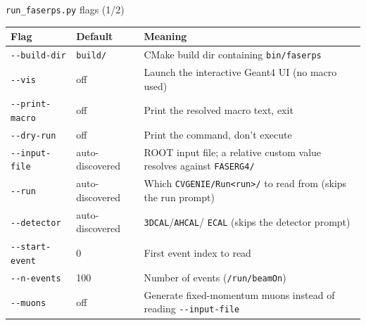 \documentclass[aspectratio=169]{beamer}
\begin{document}
\begin{frame}{\texttt{run\_faserps.py} flags (1/2)}
  \centering
  \tiny
  \begin{tabular}{@{}p{3.1cm}p{2.1cm}p{5.8cm}@{}}
    \toprule
    \textbf{Flag} & \textbf{Default} & \textbf{Meaning} \\
    \midrule
    \texttt{-{}-build-dir} & \texttt{build/} & CMake build dir containing
      \texttt{bin/faserps} \\
    \texttt{-{}-vis} & off & Launch the interactive Geant4 UI (no macro used) \\
    \texttt{-{}-print-macro} & off & Print the resolved macro text, exit \\
    \texttt{-{}-dry-run} & off & Print the command, don't execute \\
    \texttt{-{}-input-file} & auto-discovered & ROOT input file; a relative
      custom value resolves against \texttt{FASERG4/} \\
    \texttt{-{}-run} & auto-discovered & Which \texttt{CVGENIE/Run<run>/} to
      read from (skips the run prompt) \\
    \texttt{-{}-detector} & auto-discovered & \texttt{3DCAL}/\texttt{AHCAL}/
      \texttt{ECAL} (skips the detector prompt) \\
    \texttt{-{}-start-event} & 0 & First event index to read \\
    \texttt{-{}-n-events} & 100 & Number of events (\texttt{/run/beamOn}) \\
    \texttt{-{}-muons} & off & Generate fixed-momentum muons instead of
      reading \texttt{-{}-input-file} \\
    \bottomrule
  \end{tabular}
\end{frame}
\end{document}
